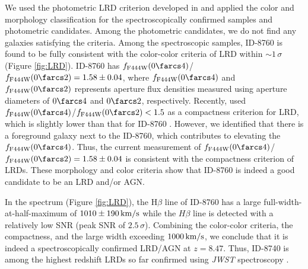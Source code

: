 \documentclass[twocolumn]{aastex631}
\begin{document}
We used the photometric LRD criterion developed in \citet{Greene2024} and applied the color and morphology classification for the spectroscopically confirmed samples and photometric candidates.
 Among the photometric candidates, we do not find any galaxies satisfying the criteria.
Among the spectroscopic samples, ID-8760 is found to be fully consistent with the color-color criteria of LRD within $\sim1\,\sigma$ (Figure \ref{fig:LRD}).
ID-8760 has $f_{\rm F444W}(0\farcs4)$/$f_{\rm F444W}(0\farcs2)=1.58\pm0.04$, where $f_{\rm F444W}(0\farcs4)$ and $f_{\rm F444W}(0\farcs2)$ represents aperture flux densities measured using aperture diameters of $0\farcs4$ and $0\farcs2$, respectively.
Recently, \citet{Greene2024} used $f_{\rm F444W}(0\farcs4)$/$f_{\rm F444W}(0\farcs2)<1.5$ as a compactness criterion for LRD, which is slightly lower than that for ID-8760 \citep[see also][for a compact criterion of 1.7]{Labbe2025}. However, we identified that there is a foreground galaxy next to the ID-8760, which contributes to elevating the $f_{\rm F444W}(0\farcs4)$. Thus, the current measurement of $f_{\rm F444W}(0\farcs4)$/$f_{\rm F444W}(0\farcs2)=1.58\pm0.04$ is consistent with the compactness criterion of LRDs.
These morphology and color criteria show that ID-8760 is indeed a good candidate to be an LRD and/or AGN.

In the spectrum (Figure \ref{fig:LRD}), the H$\beta$ line of ID-8760 has a large full-width-at-half-maximum of $1010\pm190\,{\rm km/s}$ while the $H\beta$ line is detected with a relatively low SNR (peak SNR of $2.5\,\sigma$). 
Combining the color-color criteria, the compactness, and the large width exceeding $1000\,{\rm km/s}$, we conclude that it is indeed a spectroscopically confirmed LRD/AGN at $z=8.47$. Thus, ID-8740 is among the highest redshift LRDs so far confirmed using {\it JWST} spectroscopy \citep{Kokorev2023, Larson2023}.
\end{document}
